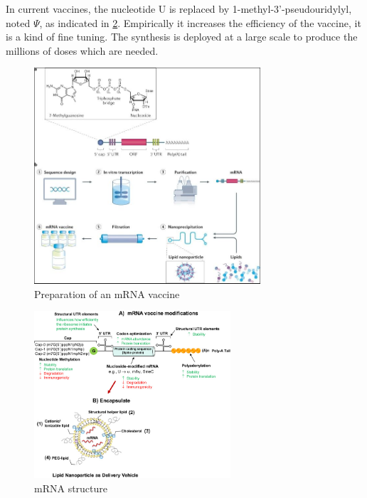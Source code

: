 \documentclass{article}
\begin{document}
            In current vaccines, the nucleotide U is replaced by 1-methyl-3'-pseudouridylyl, noted $\Psi$, as indicated in \ref{fig:mRNAvac_detail}.
            Empirically it increases the efficiency of the vaccine, it is a kind of fine tuning.
            The synthesis is deployed at a large scale to produce the millions of doses which are needed.

                        
            \begin{figure}
                \centering
                \includegraphics[width=0.75\textwidth]{imgs/mRNA_Vaccine.JPG}
                \caption{Preparation of an mRNA vaccine \autocite{MRNAVaccinesInfectious}}
                \label{fig:mRNAvac}
            \end{figure}
            
            \begin{figure}
                \centering
                \includegraphics[width=0.65\textwidth]{imgs/RNA2.jpg}
                \caption{mRNA structure \autocite{granados-riveronEngineeringCurrentNucleosidemodified2021}}
                \label{fig:mRNAvac_detail}
            \end{figure}
\end{document}
